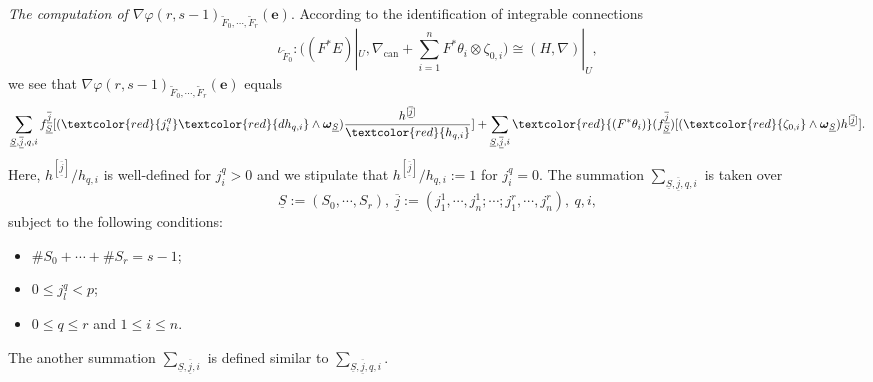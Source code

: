 \documentclass[12pt, a4paper]{article}
\begin{document}
\emph{The computation of $\nabla\varphi(r,s-1)_{\tilde F_0,\cdots,\tilde F_r}(\boldsymbol{e})$}. According to the identification of integrable connections
$$
\iota_{\tilde F_0}:((F^*E)|_U,\nabla_\mathrm{can}+\sum_{i=1}^nF^*\theta_i\otimes\zeta_{0,i})\cong (H,\nabla)|_U,
$$
we see that $\nabla\varphi(r,s-1)_{\tilde F_0,\cdots,\tilde F_r}(\boldsymbol{e})$ equals
\begin{eqnarray}\label{L nabla}
 \sum_{\underline S,\underline{\overline j},q,i}
f_{\underline S}^{\underline{\overline j}}[(\textcolor{red}{j^q_i}\textcolor{red}{dh_{q,i}}\wedge\boldsymbol{\omega}_{\underline S})\frac{h^{[\underline{\overline j}]}}{\textcolor{red}{h_{q,i}}}]+\sum_{\underline S,\underline{\overline j},i} \textcolor{red}{(F^*\theta_i)}(f_{\underline S}^{\underline{\overline j}})[(\textcolor{red}{\zeta_{0,i}}\wedge\boldsymbol{\omega}_{\underline S})h^{[\underline{\overline j}]}].
\end{eqnarray}
Here, $h^{[\underline{\overline j}]}/h_{q,i}$ is well-defined  for $j^q_i>0$ and we stipulate that $h^{[\underline{\overline j}]}/h_{q,i}:=1$ for $j^q_i=0$. The summation $\sum_{\underline S,\underline{\overline j},q,i}$ is taken over 
$$
\underline S:=(S_0,\cdots,S_r),~\underline{\overline j}:=(j^1_1,\cdots,j^1_n;\cdots;j^r_1,\cdots,j^r_n),~q,i,
$$ 
subject to the following conditions:
\begin{itemize}
    \item $\#S_0+\cdots+\#S_r=s-1$;
    \item $0\leq j^q_l<p$;
    \item $0\leq q\leq r$ and $1\leq i\leq n$.
\end{itemize}
The another summation $\sum_{\underline S,\underline{\overline j},i}$ is defined similar to $\sum_{\underline S,\underline{\overline j},q,i}$.
\end{document}
